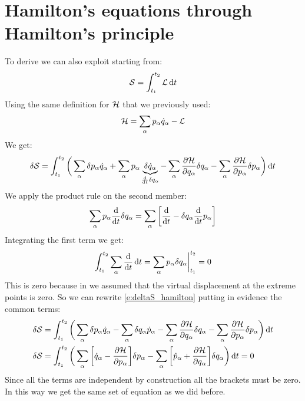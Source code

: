 \section{Hamilton's equations through Hamilton's principle}
To derive \hamiltonref\;we can also exploit \hpquotemath\;starting from:
\begin{equation}
    \mathcal{S} = \int_{t_1}^{t_2}\mathcal{L} \dd{t}
\end{equation}
Using the same definition for $\mathcal{H}$ that we previously used:
\begin{equation}
    \mathcal{H} = \displaystyle\sum_{\alpha}p_{\alpha}\dot{q}_{\alpha} - \mathcal{L}
\end{equation}
We get:
\begin{equation} \label{e:deltaS_hamilton}
    \delta \action = \int_{t_1}^{t_2}\bbrackets{\bigsum_{\alpha}\delta p_{\alpha}\dot{q}_{\alpha} + \bigsum_{\alpha} p_{\alpha} \underbrace{\delta \dot{q}_{\alpha}}_{\frac{\dd{}}{\dd{t}}\delta q_{\alpha}} - \bigsum_{\alpha} \pdv{\hamfun}{q_{\alpha}} \delta q_{\alpha}- \bigsum_{\alpha} \pdv{\hamfun}{p_{\alpha}} \delta p_{\alpha}} \dd{t}
\end{equation}
We apply the product rule on the second member:
\begin{equation}
    \bigsum_{\alpha} p_{\alpha} \dv{}{t}\delta q_{\alpha} = \bigsum_{\alpha} \bigg[ \dv{}{t}(p_{\alpha} \delta q_{\alpha}) -  \delta q_{\alpha}\dv{}{t}p_{\alpha}\bigg]
\end{equation}
Integrating the first term we get:
\begin{equation}
    \int_{t_1}^{t_2} \bigsum_{\alpha} \dv{}{t}(p_{\alpha} \delta q_{\alpha}) \dd{t} = \bigsum_{\alpha} p_{\alpha} \delta q_{\alpha} \bigg|_{t_1}^{t_2} = 0
\end{equation}
This is zero because in \hpquotemath\;we assumed that the virtual displacement at the extreme points is zero. So we can rewrite \eqref{e:deltaS_hamilton} putting in evidence the common terms:
\begin{equation}
    \begin{split}
        \delta \action &= \int_{t_1}^{t_2}\bbrackets{\bigsum_{\alpha}\delta p_{\alpha}\dot{q}_{\alpha} - \bigsum_{\alpha} \delta q_{\alpha}\dot{p}_{\alpha} - \bigsum_{\alpha} \pdv{\hamfun}{q_{\alpha}} \delta q_{\alpha}- \bigsum_{\alpha} \pdv{\hamfun}{p_{\alpha}} \delta p_{\alpha}} \dd{t} \\
        \delta \action &= \int_{t_1}^{t_2}\bbrackets{\bigsum_{\alpha}\bigg[\dot{q}_{\alpha} - \pdv{\hamfun}{p_{\alpha}}\bigg] \delta p_{\alpha} - \bigsum_{\alpha} \bigg[\dot{p}_{\alpha} + \pdv{\hamfun}{q_{\alpha}} \bigg]\delta q_{\alpha}} \dd{t} = 0
    \end{split}
\end{equation}
Since all the terms are independent by construction all the brackets must be zero. In this way we get the same set of equation as we did before.
